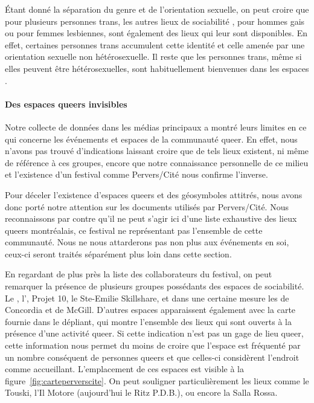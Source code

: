 Étant donné la séparation du genre et de l'orientation sexuelle, on peut croire que pour plusieurs personnes trans, les autres lieux de sociabilité \lgbt, pour hommes gais ou pour femmes lesbiennes, sont également des lieux qui leur sont disponibles.
En effet, certaines personnes trans accumulent cette identité et celle amenée par une orientation sexuelle non hétérosexuelle.
Il reste que les personnes trans, même si elles peuvent être hétérosexuelles, sont habituellement bienvenues dans les espaces \lgbt{}.

\paragraph{Des espaces queers  invisibles}
Notre collecte de données dans les médias principaux a montré leurs limites en ce qui concerne les événements et espaces de la communauté queer.
En effet, nous n'avons pas trouvé d'indications laissant croire que de tels lieux existent, ni même de référence à ces groupes, encore que notre connaissance personnelle de ce milieu et l'existence d'un festival comme Pervers/Cité nous confirme l'inverse.

Pour déceler l'existence d'espaces queers et des géosymboles attitrés, nous avons donc porté notre attention sur les documents utilisés par Pervers/Cité.
Nous reconnaissons par contre qu'il ne peut s'agir ici d'une liste exhaustive des lieux queers montréalais, ce festival ne représentant pas l'ensemble de cette communauté.
Nous ne nous attarderons pas non plus aux événements en soi, ceux-ci seront traités séparément plus loin dans cette section.

En regardant de plus près la liste des collaborateurs du festival, on peut remarquer la présence de plusieurs groupes possédants  des espaces de sociabilité.
Le \alccva{}, l'\astteq{}, Projet 10, le Ste-Emilie Skillshare, et dans une
certaine mesure les \grip{} de Concordia et de McGill.
D'autres espaces apparaissent également avec la carte fournie dans le dépliant, qui montre l'ensemble des lieux qui sont ouverts à la présence d'une activité queer.
Si cette indication n'est pas un gage de lieu queer, cette information nous permet du moins de croire que l'espace est fréquenté par un nombre conséquent de personnes queers et que celles-ci considèrent l'endroit comme accueillant.
L'emplacement de ces espaces est visible à la figure~\ref{fig:carteperverscite}.
On peut souligner particulièrement les lieux comme le Touski, l'Il Motore (aujourd'hui le Ritz P.D.B.), ou encore la Salla Rossa.

